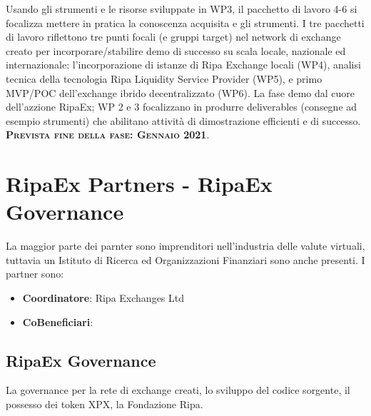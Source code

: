 \documentclass[11pt,fleqn,oneside]{book} %
\begin{document}
\begin{center}
\resizebox{0.05\textwidth}{26pt}{$\Downarrow$}

\begin{tcolorbox}[roadmapBox,
	title=\textbf{\textsc{Sviluppo di un exchange ibrido-decentralizzato (WP 4-6)}}]

	Usando gli strumenti e le risorse sviluppate in WP3, il pacchetto di lavoro 4-6
	si focalizza mettere in pratica la conoscenza acquisita e gli strumenti. I tre
	pacchetti di lavoro riflettono tre punti focali (e gruppi target) nel network di 
	exchange creato per incorporare/stabilire demo di successo su scala locale, nazionale ed internazionale:
	l'incorporazione di istanze di Ripa Exchange locali (WP4), analisi tecnica della tecnologia
	Ripa Liquidity Service Provider (WP5), e primo MVP/POC dell'exchange ibrido decentralizzato (WP6).
	La fase demo dal cuore dell'azzione RipaEx; WP 2 e 3 focalizzano in produrre deliverables (consegne ad esempio
	strumenti) che abilitano attività di dimostrazione efficienti e di successo.\\
	\vspace{1cm}
	\centering\textbf{\textsc{Prevista fine della fase: Gennaio 2021}}.
\end{tcolorbox}
\end{center}

\section{RipaEx Partners - RipaEx Governance}
La maggior parte dei parnter sono imprenditori nell'industria delle valute virtuali, tuttavia
un Istituto di Ricerca ed Organizzazioni Finanziari sono anche presenti. I partner sono:
\begin{itemize}
	\item \textbf{Coordinatore}: Ripa Exchanges Ltd
	\item \textbf{CoBeneficiari}: 
\end{itemize}
\subsection{RipaEx Governance}
La governance per la rete di exchange creati, lo sviluppo del codice sorgente, il possesso dei token XPX, la Fondazione Ripa.
\end{document}
